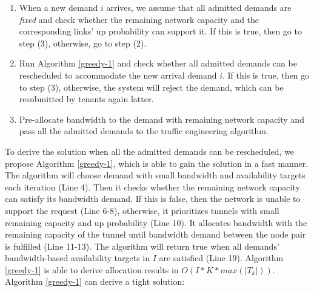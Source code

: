 \documentclass[sigconf]{acmart}
\begin{document}
\begin{enumerate}
    \item When a new demand $i$ arrives, we assume that all admitted demands are \textit{fixed} and check whether the remaining network capacity and the corresponding links' up probability can support it. If this is true, then go to step (3), otherwise, go to step (2).
    \item Run Algorithm \ref{greedy-1}  and check whether all admitted demands can be rescheduled to accommodate the new arrival demand $i$. If this is true, then go to step (3), otherwise, the system will reject the demand, which can be resubmitted by tenants again latter.
    \item Pre-allocate bandwidth to the demand with remaining network capacity and pass all the admitted demands to the traffic engineering algorithm.
\end{enumerate}

%
To derive the solution when all the admitted demands can be rescheduled, we propose  Algorithm \ref{greedy-1}, which is able to gain the solution in a fast manner.
The algorithm will choose demand with small bandwidth and availability targets each iteration (Line 4).
Then it checks whether the remaining network capacity can satisfy its bandwidth demand.
If this is false, then the network is unable to support the request (Line 6-8), otherwise,  it prioritizes tunnels with small remaining capacity and up probability (Line 10).
It allocates bandwidth with the remaining capacity of the tunnel until bandwidth demand between the node pair is fulfilled (Line 11-13).
The algorithm will return true when all demands' bandwidth-based availability targets in $I$ are satisfied (Line 19).
Algorithm \ref{greedy-1} is able to derive allocation results in $O(I*K*max(|T_k|))$.
Algorithm \ref{greedy-1} can derive a tight solution:




\end{document}
